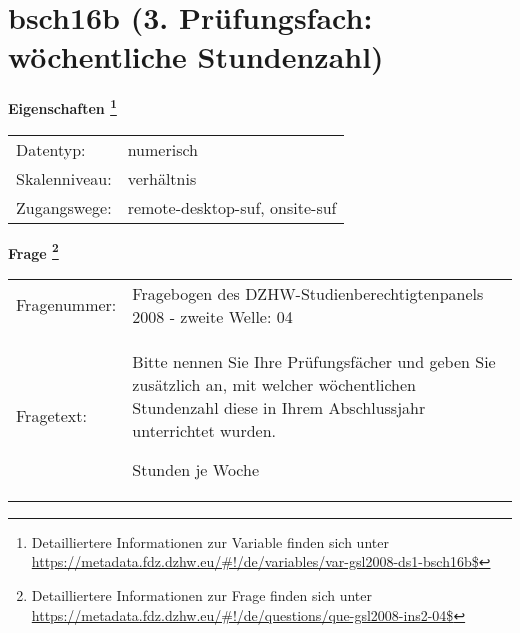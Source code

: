 
    \setcounter{footnote}{0}

    \vspace*{-1.8cm}
	\section{bsch16b (3. Prüfungsfach: wöchentliche Stundenzahl)}
	\label{section:bsch16b}



    \vspace*{0.5cm}
    \noindent\textbf{Eigenschaften
	\footnote{Detailliertere Informationen zur Variable finden sich unter
		\url{https://metadata.fdz.dzhw.eu/\#!/de/variables/var-gsl2008-ds1-bsch16b$}}}\\
	\begin{tabularx}{\hsize}{@{}lX}
	Datentyp: & numerisch \\
	Skalenniveau: & verhältnis \\
	Zugangswege: &
	  remote-desktop-suf, 
	  onsite-suf
 \\
    \end{tabularx}



				\vspace*{0.5cm}
                \noindent\textbf{Frage
	                \footnote{Detailliertere Informationen zur Frage finden sich unter
		              \url{https://metadata.fdz.dzhw.eu/\#!/de/questions/que-gsl2008-ins2-04$}}}\\
				\begin{tabularx}{\hsize}{@{}lX}
					Fragenummer: &
					  Fragebogen des DZHW-Studienberechtigtenpanels 2008 - zweite Welle:
					  04
 \\
					Fragetext: & Bitte nennen Sie Ihre Prüfungsfächer und geben Sie zusätzlich an, mit welcher wöchentlichen Stundenzahl diese in Ihrem Abschlussjahr unterrichtet wurden.\par  Stunden je Woche \\
				\end{tabularx}





